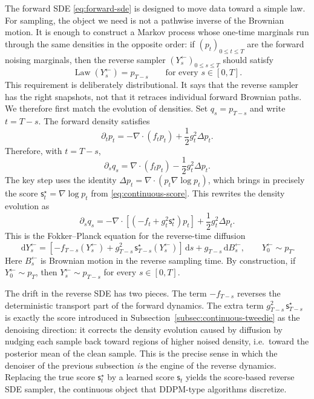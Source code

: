 \documentclass[10pt,a4paper]{amsart}
\numberwithin{equation}{section}
\DeclareMathOperator{\Law}{Law}
\newcommand{\dd}{\,\mathrm{d}}
\newcommand{\sstar}{\mathsf{s}^{\star}}
\newcommand{\score}{\mathsf{s}}
\begin{document}
The forward SDE \eqref{eq:forward-sde} is designed to move data toward a simple
law.  For sampling, the object we need is not a pathwise inverse of the
Brownian motion.  It is enough to construct a Markov process whose one-time
marginals run through the same densities in the opposite order: if
$(p_t)_{0\leq t\leq T}$ are the forward noising marginals, then the reverse
sampler $(Y^{\leftarrow}_s)_{0\leq s\leq T}$ should satisfy
\[
    \Law(Y^{\leftarrow}_s)=p_{T-s}
    \qquad\text{for every }s\in[0,T].
\]
This requirement is deliberately distributional.  It says that the reverse
sampler has the right snapshots, not that it retraces individual forward
Brownian paths.  We therefore first match the evolution of densities.
Set $q_s=p_{T-s}$ and write $t=T-s$.  The forward density satisfies
\[
    \partial_t p_t
    =
    -\nabla\cdot(f_tp_t)
    +\frac12g_t^2\Delta p_t.
\]
Therefore, with $t=T-s$,
\[
    \partial_s q_s
    =
    \nabla\cdot(f_t p_t)
    -\frac12g_t^2\Delta p_t.
\]
The key step uses the identity $\Delta p_t=\nabla\cdot(p_t\nabla\log p_t)$,
which brings in precisely the score $\sstar_t=\nabla\log p_t$ from
\eqref{eq:continuous-score}.  This rewrites the density evolution as
\[
    \partial_s q_s
    =
    -\nabla\cdot\left[
    \left(-f_t+g_t^2\sstar_t\right)p_t
    \right]
    +\frac12g_t^2\Delta p_t.
\]
This is the Fokker--Planck equation for the reverse-time diffusion
\begin{equation}\label{eq:reverse-sde}
    \dd Y^{\leftarrow}_s
    =
    \left[-f_{T-s}(Y^{\leftarrow}_s)
    +g_{T-s}^2\,\sstar_{T-s}(Y^{\leftarrow}_s)\right]\dd s
    +g_{T-s}\dd B^{\leftarrow}_s,
    \qquad Y^{\leftarrow}_0\sim p_T.
\end{equation}
Here $B^{\leftarrow}_s$ is Brownian motion in the reverse sampling time.  By
construction, if $Y^{\leftarrow}_0\sim p_T$, then $Y^{\leftarrow}_s\sim p_{T-s}$ for every $s\in[0,T]$.

The drift in the reverse SDE has two pieces.  The term $-f_{T-s}$ reverses the
deterministic transport part of the forward dynamics.  The extra term
$g_{T-s}^2\,\sstar_{T-s}$ is exactly the score introduced in
Subsection~\ref{subsec:continuous-tweedie} as the denoising direction: it corrects the density
evolution caused by diffusion by nudging each sample back toward regions of
higher noised density, i.e.\ toward the posterior mean of the clean sample.
This is the precise sense in which the denoiser of the previous subsection
\emph{is} the engine of the reverse dynamics.  Replacing the true score
$\sstar_t$ by a learned score $\score_t$ yields the score-based reverse SDE
sampler, the continuous object that DDPM-type algorithms discretize.
\end{document}
